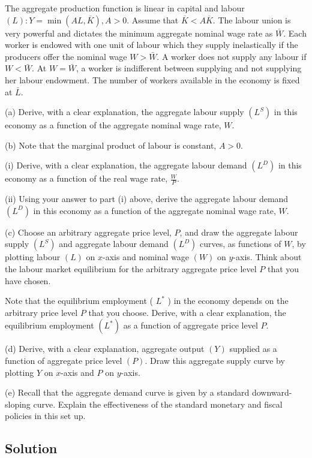The aggregate production function is linear in capital and labour \((L): Y = \min(A L , \overline{K}), A>0\). Assume that \(\overline{K}< A \overline{K}\). The labour union is very powerful and dictates the minimum aggregate nominal wage rate as \(\bar{W}\). Each worker is endowed with one unit of labour which they supply inelastically if the producers offer the nominal wage \(W>\bar{W}\). A worker does not supply any labour if \(W<\bar{W}\). At \(W=\bar{W}\), a worker is indifferent between supplying and not supplying her labour endowment. The number of workers available in the economy is fixed at \(\bar{L}\).

(a) Derive, with a clear explanation, the aggregate labour supply \(\left(L^S\right)\) in this economy as a function of the aggregate nominal wage rate, \(W\).

(b) Note that the marginal product of labour is constant, \(A>0\).

(i) Derive, with a clear explanation, the aggregate labour demand \(\left(L^D\right)\) in this economy as a function of the real wage rate, \(\frac{W}{P}\).

(ii) Using your answer to part (i) above, derive the aggregate labour demand \(\left(L^D\right)\) in this economy as a function of the aggregate nominal wage rate, \(W\).

(c) Choose an arbitrary aggregate price level, \(P\), and draw the aggregate labour supply \(\left(L^S\right)\) and aggregate labour demand \(\left(L^D\right)\) curves, as functions of \(W\), by plotting labour \((L)\) on \(x\)-axis and nominal wage \((W)\) on \(y\)-axis. Think about the labour market equilibrium for the arbitrary aggregate price level \(P\) that you have chosen.

Note that the equilibrium employment ( \(L^*\) ) in the economy depends on the arbitrary price level \(P\) that you choose. Derive, with a clear explanation, the equilibrium employment \(\left(L^*\right)\) as a function of aggregate price level \(P\).

(d) Derive, with a clear explanation, aggregate output \((Y)\) supplied as a function of aggregate price level \((P)\). Draw this aggregate supply curve by plotting \(Y\) on \(x\)-axis and \(P\) on \(y\)-axis.

(e) Recall that the aggregate demand curve is given by a standard downward-sloping curve. Explain the effectiveness of the standard monetary and fiscal policies in this set up.

 \subsection*{Solution}

